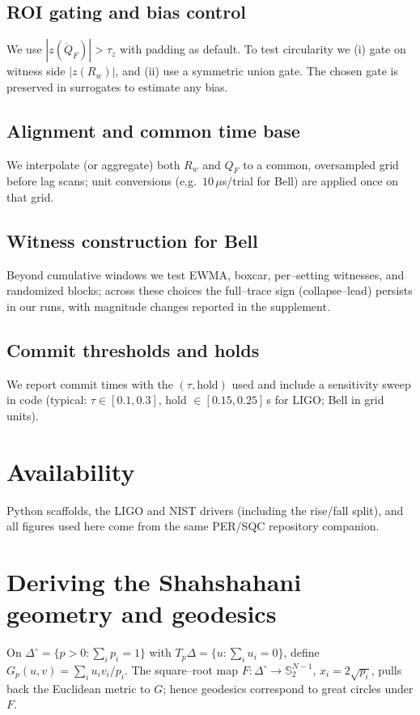 \documentclass[11pt]{article}
\begin{document}
\subsection*{ROI gating and bias control}
We use $|z(\dot Q_F)|>\tau_z$ with padding as default. To test circularity we (i) gate on witness side $|z(R_w)|$, and (ii) use a symmetric union gate.
The chosen gate is preserved in surrogates to estimate any bias.

\subsection*{Alignment and common time base}
We interpolate (or aggregate) both $R_w$ and $Q_F$ to a common, oversampled grid before lag scans; unit conversions (e.g.\ $10\,\mu$s/trial for Bell) are applied once on that grid.

\subsection*{Witness construction for Bell}
Beyond cumulative windows we test EWMA, boxcar, per–setting witnesses, and randomized blocks; across these choices the full–trace sign (collapse–lead) persists in our runs, with magnitude changes reported in the supplement.

\subsection*{Commit thresholds and holds}
We report commit times with the $(\tau,\text{hold})$ used and include a sensitivity sweep in code (typical: $\tau\in[0.1,0.3]$, hold $\in[0.15,0.25]$\,s for LIGO; Bell in grid units).

\section*{Availability}
Python scaffolds, the LIGO and NIST drivers (including the rise/fall split), and all figures used here come from the same PER/SQC repository companion.

\appendix
\section{Deriving the Shahshahani geometry and geodesics}\label{app:shahshahani}
On $\Delta^\circ=\{p>0:\sum_i p_i=1\}$ with $T_p\Delta=\{u:\sum_i u_i=0\}$, define $G_p(u,v)=\sum_i u_i v_i/p_i$.
The square–root map $F:\Delta^\circ\to\mathbb{S}^{N-1}_2$, $x_i=2\sqrt{p_i}$, pulls back the Euclidean metric to $G$; hence geodesics correspond to great circles under $F$.
\end{document}
